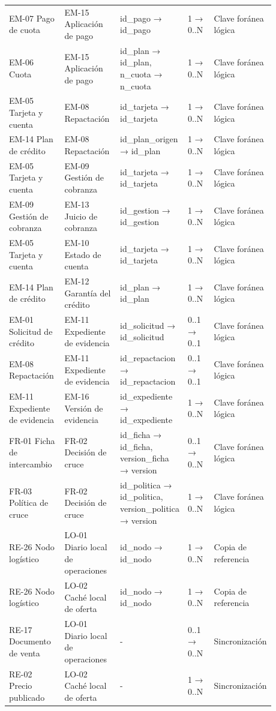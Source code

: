 \documentclass[11pt]{article}
\begin{document}
\begin{longtable}{@{}p{0.215\linewidth}p{0.215\linewidth}p{0.224\linewidth}p{0.103\linewidth}p{0.120\linewidth}@{}}
EM-07 Pago de cuota & EM-15 Aplicación de pago & id\_pago → id\_pago & 1 → 0..N & Clave foránea lógica \\
EM-06 Cuota & EM-15 Aplicación de pago & id\_plan → id\_plan, n\_cuota → n\_cuota & 1 → 0..N & Clave foránea lógica \\
EM-05 Tarjeta y cuenta & EM-08 Repactación & id\_tarjeta → id\_tarjeta & 1 → 0..N & Clave foránea lógica \\
EM-14 Plan de crédito & EM-08 Repactación & id\_plan\_origen → id\_plan & 1 → 0..N & Clave foránea lógica \\
EM-05 Tarjeta y cuenta & EM-09 Gestión de cobranza & id\_tarjeta → id\_tarjeta & 1 → 0..N & Clave foránea lógica \\
EM-09 Gestión de cobranza & EM-13 Juicio de cobranza & id\_gestion → id\_gestion & 1 → 0..N & Clave foránea lógica \\
EM-05 Tarjeta y cuenta & EM-10 Estado de cuenta & id\_tarjeta → id\_tarjeta & 1 → 0..N & Clave foránea lógica \\
EM-14 Plan de crédito & EM-12 Garantía del crédito & id\_plan → id\_plan & 1 → 0..N & Clave foránea lógica \\
EM-01 Solicitud de crédito & EM-11 Expediente de evidencia & id\_solicitud → id\_solicitud & 0..1 → 0..1 & Clave foránea lógica \\
EM-08 Repactación & EM-11 Expediente de evidencia & id\_repactacion → id\_repactacion & 0..1 → 0..1 & Clave foránea lógica \\
EM-11 Expediente de evidencia & EM-16 Versión de evidencia & id\_expediente → id\_expediente & 1 → 0..N & Clave foránea lógica \\
FR-01 Ficha de intercambio & FR-02 Decisión de cruce & id\_ficha → id\_ficha, version\_ficha → version & 0..1 → 0..N & Clave foránea lógica \\
FR-03 Política de cruce & FR-02 Decisión de cruce & id\_politica → id\_politica, version\_politica → version & 1 → 0..N & Clave foránea lógica \\
RE-26 Nodo logístico & LO-01 Diario local de operaciones & id\_nodo → id\_nodo & 1 → 0..N & Copia de referencia \\
RE-26 Nodo logístico & LO-02 Caché local de oferta & id\_nodo → id\_nodo & 1 → 0..N & Copia de referencia \\
RE-17 Documento de venta & LO-01 Diario local de operaciones & - & 0..1 → 0..N & Sincronización \\
RE-02 Precio publicado & LO-02 Caché local de oferta & - & 1 → 0..N & Sincronización \\
\end{longtable}
\end{document}
